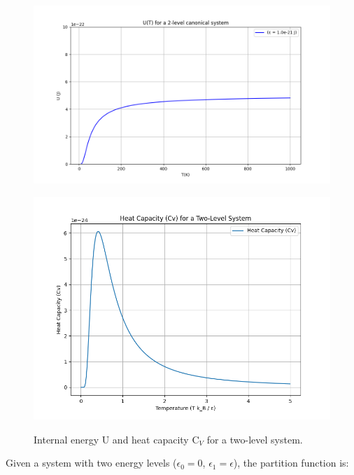 \documentclass{article}
\begin{document}
\begin{figure}[h!]
    \centering
    \begin{minipage}{0.45\textwidth}
        \centering
        \includegraphics[width=\textwidth]{images/u-canonical-2-levels.png}
        \label{fig:image1}
    \end{minipage}
    \hfill
    \begin{minipage}{0.45\textwidth}
        \centering
        \includegraphics[width=\textwidth]{images/cv-canonical-2-levels.png}
        \label{fig:image2}
    \end{minipage}
    \caption{
        Internal energy U and heat capacity C$_V$ for a two-level system.
    }
    \label{fig:spin-system}
\end{figure}

Given a system with two energy levels ($\epsilon_0=0$, $\epsilon_1=\epsilon$), the partition function is:
\end{document}
